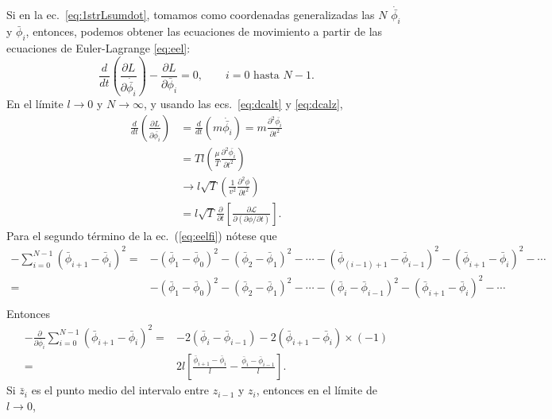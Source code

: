 Si en la ec.~\eqref{eq:1strLsumdot}, tomamos como coordenadas
generalizadas las $N$ $\dot{\bar{\phi_i}}$ y $\bar\phi_i$, entonces, podemos
obtener las ecuaciones de movimiento a partir de las ecuaciones de
Euler-Lagrange \eqref{eq:eel}:
\begin{equation}
  \label{eq:eelfi}
   \frac{d}{dt} \left ( \frac{\partial L}{\partial\dot{\bar{\phi_i}}} \right ) -
   \frac{\partial L}{\partial \bar\phi_i} = 0,
\qquad \text{$i=0$ hasta $N-1$}.
\end{equation}
En el límite $l\to0$ y $N\to\infty$, y usando las ecs.~\eqref{eq:dcalt} 
y \eqref{eq:dcalz}, %
\begin{align}
  \label{eq:emov1}
  \frac{d}{dt} \left( \frac{\partial L}{\partial\dot{\bar{\phi_i}}} \right)
  &=\frac{d}{dt} \left( m\dot{\bar{\phi_i}} \right)
= m\frac{\partial^2\bar{\phi_i}}{\partial t^2} \nonumber\\
&= T l\left(\frac{\mu}{T}\frac{\partial^2\bar{\phi_i}}{\partial t^2} \right)\nonumber\\
  &\to
  l\sqrt{T}
  \left(
    \frac{1}{v^2}\frac{\partial^2\phi}{\partial t^2}
  \right)\\
  \label{eq:eecalt} %
  &=l\sqrt{T}\frac{\partial}{\partial t}
  \left[
    \frac{\partial\mathcal{L}}{\partial
      (\partial\phi/\partial t)}
  \right].
\end{align}
Para el segundo término de la ec.~(\ref{eq:eelfi}) nótese que
\begin{align}
- \sum_{i=0}^{N-1}\left(\bar\phi_{i+1}-\bar\phi_{i}\right)^2= 
 &-\left(\bar\phi_{1}-\bar\phi_{0}\right)^2-\left(\bar\phi_{2}-\bar\phi_{1}\right)^2-\cdots
-\left(\bar\phi_{(i-1)+1}-\bar\phi_{i-1}\right)^2-\left(\bar\phi_{i+1}-\bar\phi_{i}\right)^2-\cdots\nonumber\\
 =&-\left(\bar\phi_{1}-\bar\phi_{0}\right)^2-\left(\bar\phi_{2}-\bar\phi_{1}\right)^2-\cdots
 -\left(\bar\phi_{i}-\bar\phi_{i-1}\right)^2-\left(\bar\phi_{i+1}-\bar\phi_{i}\right)^2-\cdots\nonumber\\
\end{align}
Entonces
\begin{align}
-\frac{\partial}{\partial\bar\phi_i}  \sum_{i=0}^{N-1}\left(\bar\phi_{i+1}-\bar\phi_{i}\right)^2
=&-2\left(\bar\phi_{i}-\bar\phi_{i-1}\right)-2\left(\bar\phi_{i+1}-\bar\phi_{i}\right)\times(-1)\nonumber\\
=&2l\left[\frac{\bar\phi_{i+1}-\bar\phi_{i}}{l}-\frac{\bar\phi_{i}-\bar\phi_{i-1}}{l}\right].\nonumber
\end{align}
Si $\bar{z}_i$ es el punto medio del intervalo entre $z_{i-1}$ y $z_i$, entonces en el límite de $l\to0$,
